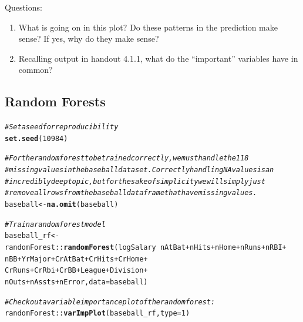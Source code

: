 \documentclass{article}\usepackage[]{graphicx}\usepackage[]{color}
\makeatletter
\newcommand{\hlnum}[1]{\textcolor[rgb]{0.686,0.059,0.569}{#1}}%
\newcommand{\hlcom}[1]{\textcolor[rgb]{0.678,0.584,0.686}{\textit{#1}}}%
\newcommand{\hlopt}[1]{\textcolor[rgb]{0,0,0}{#1}}%
\newcommand{\hlstd}[1]{\textcolor[rgb]{0.345,0.345,0.345}{#1}}%
\newcommand{\hlkwb}[1]{\textcolor[rgb]{0.69,0.353,0.396}{#1}}%
\newcommand{\hlkwc}[1]{\textcolor[rgb]{0.333,0.667,0.333}{#1}}%
\newcommand{\hlkwd}[1]{\textcolor[rgb]{0.737,0.353,0.396}{\textbf{#1}}}%
\newenvironment{kframe}{%
 \def\at@end@of@kframe{}%
 \ifinner\ifhmode%
  \def\at@end@of@kframe{\end{minipage}}%
  \begin{minipage}{\columnwidth}%
 \fi\fi%
 \def\FrameCommand##1{\hskip\@totalleftmargin \hskip-\fboxsep
 \colorbox{shadecolor}{##1}\hskip-\fboxsep
     \hskip-\linewidth \hskip-\@totalleftmargin \hskip\columnwidth}%
 \MakeFramed {\advance\hsize-\width
   \@totalleftmargin\z@ \linewidth\hsize
   \@setminipage}}%
 {\par\unskip\endMakeFramed%
 \at@end@of@kframe}
\newenvironment{knitrout}{}{} %
\makeatother
\begin{document}
Questions:
\begin{enumerate}
  \item What is going on in this plot? Do these patterns in the prediction make sense? If yes, why do they make sense?
  \item Recalling output in handout 4.1.1, what do the ``important'' variables have in common?
\end{enumerate}

\newpage

\subsection*{Random Forests}

\begin{knitrout}
\color{fgcolor}\begin{kframe}
\begin{alltt}
\hlcom{# Set a seed for reproducibility}
\hlkwd{set.seed}\hlstd{(}\hlnum{10984}\hlstd{)}

\hlcom{# For the random forest to be trained correctly, we must handle the 118}
\hlcom{# missing values in the baseball dataset. Correctly handling NA values is an}
\hlcom{# incredibly deep topic, but for the sake of simplicity we will simply just}
\hlcom{# remove all rows from the baseball dataframe that have missing values.}
\hlstd{baseball} \hlkwb{<-} \hlkwd{na.omit}\hlstd{(baseball)}

\hlcom{# Train a random forest model}
\hlstd{baseball_rf} \hlkwb{<-}
  \hlstd{randomForest}\hlopt{::}\hlkwd{randomForest}\hlstd{(logSalary} \hlopt{~} \hlstd{nAtBat} \hlopt{+} \hlstd{nHits} \hlopt{+} \hlstd{nHome} \hlopt{+} \hlstd{nRuns} \hlopt{+} \hlstd{nRBI} \hlopt{+}
                               \hlstd{nBB} \hlopt{+} \hlstd{YrMajor} \hlopt{+} \hlstd{CrAtBat} \hlopt{+} \hlstd{CrHits} \hlopt{+} \hlstd{CrHome} \hlopt{+}
                               \hlstd{CrRuns} \hlopt{+} \hlstd{CrRbi} \hlopt{+} \hlstd{CrBB} \hlopt{+} \hlstd{League} \hlopt{+} \hlstd{Division} \hlopt{+}
                               \hlstd{nOuts} \hlopt{+} \hlstd{nAssts} \hlopt{+} \hlstd{nError,} \hlkwc{data} \hlstd{= baseball)}

\hlcom{# Check out a variable importance plot of the random forest:}
\hlstd{randomForest}\hlopt{::}\hlkwd{varImpPlot}\hlstd{(baseball_rf,} \hlkwc{type} \hlstd{=} \hlnum{1}\hlstd{)}
\end{alltt}


{\ttfamily\noindent\bfseries\color{errorcolor}{\#\# Error in imp[, i]: subscript out of bounds}}\end{kframe}
\end{knitrout}
\end{document}
